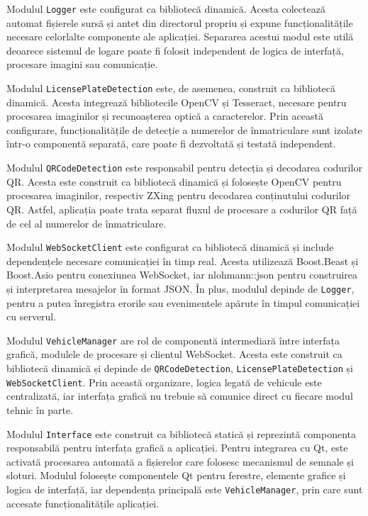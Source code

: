 Modulul \texttt{Logger} este configurat ca bibliotecă dinamică. Acesta colectează automat fișierele sursă și antet din directorul propriu și expune funcționalitățile necesare celorlalte componente ale aplicației. Separarea acestui modul este utilă deoarece sistemul de logare poate fi folosit independent de logica de interfață, procesare imagini sau comunicație.

Modulul \texttt{LicensePlateDetection} este, de asemenea, construit ca bibliotecă dinamică. Acesta integrează bibliotecile OpenCV și Tesseract, necesare pentru procesarea imaginilor și recunoașterea optică a caracterelor. Prin această configurare, funcționalitățile de detecție a numerelor de înmatriculare sunt izolate într-o componentă separată, care poate fi dezvoltată și testată independent.

Modulul \texttt{QRCodeDetection} este responsabil pentru detecția și decodarea codurilor QR. Acesta este construit ca bibliotecă dinamică și folosește OpenCV pentru procesarea imaginilor, respectiv ZXing pentru decodarea conținutului codurilor QR. Astfel, aplicația poate trata separat fluxul de procesare a codurilor QR față de cel al numerelor de înmatriculare.

Modulul \texttt{WebSocketClient} este configurat ca bibliotecă dinamică și include dependențele necesare comunicației în timp real. Acesta utilizează Boost.Beast și Boost.Asio pentru conexiunea WebSocket, iar nlohmann::json pentru construirea și interpretarea mesajelor în format JSON. În plus, modulul depinde de \texttt{Logger}, pentru a putea înregistra erorile sau evenimentele apărute în timpul comunicației cu serverul.

Modulul \texttt{VehicleManager} are rol de componentă intermediară între interfața grafică, modulele de procesare și clientul WebSocket. Acesta este construit ca bibliotecă dinamică și depinde de \texttt{QRCodeDetection}, \texttt{LicensePlateDetection} și \texttt{WebSocketClient}. Prin această organizare, logica legată de vehicule este centralizată, iar interfața grafică nu trebuie să comunice direct cu fiecare modul tehnic în parte.

Modulul \texttt{Interface} este construit ca bibliotecă statică și reprezintă componenta responsabilă pentru interfața grafică a aplicației. Pentru integrarea cu Qt, este activată procesarea automată a fișierelor care folosesc mecanismul de semnale și sloturi. Modulul folosește componentele Qt pentru ferestre, elemente grafice și logica de interfață, iar dependența principală este \texttt{VehicleManager}, prin care sunt accesate funcționalitățile aplicației.

